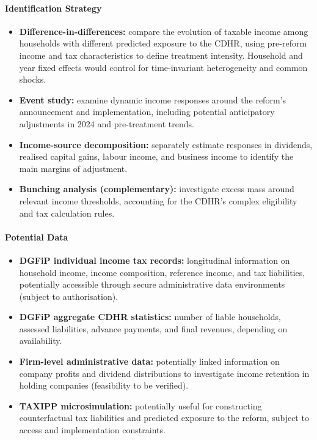 \documentclass{article}
\begin{document}
\paragraph{Identification Strategy}
\begin{itemize}
    \item \textbf{Difference-in-differences:} compare the evolution of taxable income among households with different predicted exposure to the CDHR, using pre-reform income and tax characteristics to define treatment intensity. Household and year fixed effects would control for time-invariant heterogeneity and common shocks.

    \item \textbf{Event study:} examine dynamic income responses around the reform's announcement and implementation, including potential anticipatory adjustments in 2024 and pre-treatment trends.

    \item \textbf{Income-source decomposition:} separately estimate responses in dividends, realised capital gains, labour income, and business income to identify the main margins of adjustment.

    \item \textbf{Bunching analysis (complementary):} investigate excess mass around relevant income thresholds, accounting for the CDHR's complex eligibility and tax calculation rules.
\end{itemize}

\paragraph{Potential Data}
\begin{itemize}
    \item \textbf{DGFiP individual income tax records:} longitudinal information on household income, income composition, reference income, and tax liabilities, potentially accessible through secure administrative data environments (subject to authorisation).
    \item \textbf{DGFiP aggregate CDHR statistics:} number of liable households, assessed liabilities, advance payments, and final revenues, depending on availability.
    \item \textbf{Firm-level administrative data:} potentially linked information on company profits and dividend distributions to investigate income retention in holding companies (feasibility to be verified).
    \item \textbf{TAXIPP microsimulation:} potentially useful for constructing counterfactual tax liabilities and predicted exposure to the reform, subject to access and implementation constraints.
\end{itemize}
\end{document}
